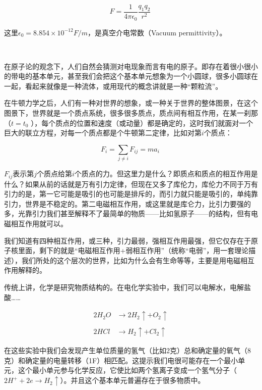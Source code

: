 \begin{equation}
F = \frac{1}{4 \pi \epsilon_0 } \frac{q_1 q_2}{r^2}~
\end{equation}

这里$\epsilon_0 = 8.854 \times 10^{-12} F/m$，是真空介电常数（Vacuum permittivity）。

~

在原子论的观念下，人们自然会猜测对电现象而言有电的原子。即存在着很小很小的带电的基本单元，甚至我们会把这个基本单元想象为一个小圆球，很多小圆球在一起，看起来就像是一种流体，或用现代的概念讲就是一种“颗粒流”。

在牛顿力学之后，人们有一种对世界的想象，或一种关于世界的整体图景，在这个图景下，世界就是一个质点系统，很多很多质点，质点间有相互作用，在某一刹那（$t = t_0 $ ），每个质点的位置和速度（或动量）都是确定的，这时我们就面对一个巨大的联立方程，对每一个质点都是个牛顿第二定律，比如对第$i$个质点：

\begin{equation}
F_i = \sum\limits_{ j \neq i } F_{ij}    =  m a_i~
\end{equation}

$F_{ij}$表示第$j$个质点给第$i$个质点的力。但这里力是什么？即质点和质点的相互作用是什么？如果从前的话就是万有引力定律，但现在又多了库伦力，库伦力不同于万有引力的是，第一它可能是吸引的也可能是排斥的，而引力就只能是吸引的，单纯靠引力，世界是不稳定的。第二电磁相互作用，或这里就是库仑力，比引力要强的多，光靠引力我们甚至解释不了最简单的物质——比如氢原子——的结构，但有电磁相互作用就可以。

我们知道有四种相互作用，或三种，引力最弱，强相互作用最强，但它仅存在于原子核里面，剩下的就是“电磁相互作用+弱相互作用”（统称“电弱”，用一套理论描述），我们所处的这个层次的世界，比如为什么会有生命等等，主要是用电磁相互作用解释的。

传统上讲，化学是研究物质结构的。在电化学实验中，我们可以电解水，电解盐酸……

\begin{align}
2H_2O &\rightarrow 2H_2 \uparrow + O_2 \uparrow \\\\
2HCl &\rightarrow H_2 \uparrow + Cl_2 \uparrow ~
\end{align}

在这些实验中我们会发现产生单位质量的氢气（比如2克）总和确定量的氧气（8克）和确定量的电量转移（1F）相匹配。这提示我们电很可能存在一个最小单元，这个最小单元参与化学反应，它使比如两个氢离子变成一个氢气分子（$2 H^+ + 2 e \to H_2  \uparrow $）。并且这个基本单元普遍存在于很多物质中。

